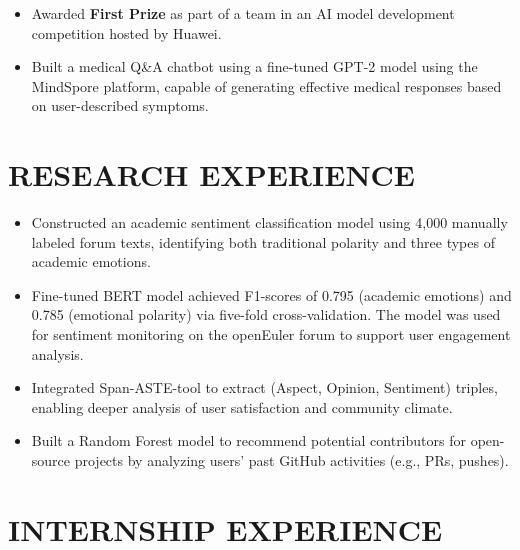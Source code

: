 \documentclass{resume}
\begin{document}
\begin{itemize}
    \item Awarded \textbf{First Prize} as part of a team in an AI model development competition hosted by Huawei.
    \item Built a medical Q\&A chatbot using a fine-tuned GPT-2 model using the MindSpore platform, capable of generating effective medical responses based on user-described symptoms.
\end{itemize}


\section{\bf RESEARCH EXPERIENCE}

\begin{itemize}
    \item Constructed an academic sentiment classification model using 4,000 manually labeled forum texts, identifying both traditional polarity and three types of academic emotions.
    \item Fine-tuned BERT model achieved F1-scores of 0.795 (academic emotions) and 0.785 (emotional polarity) via five-fold cross-validation. The model was used for sentiment monitoring on the openEuler forum to support user engagement analysis.


    \item Integrated Span-ASTE-tool to extract (Aspect, Opinion, Sentiment) triples, enabling deeper analysis of user satisfaction and community climate.
\end{itemize}

\begin{itemize}
    \item Built a Random Forest model to recommend potential contributors for open-source projects by analyzing users' past GitHub activities (e.g., PRs, pushes).
\end{itemize}



\section{\bf INTERNSHIP EXPERIENCE}
\end{document}
